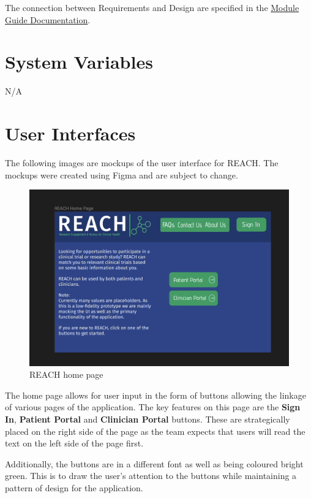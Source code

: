 \documentclass[12pt, titlepage]{article}
\begin{document}
The connection between Requirements and Design are specified in the \href{https://github.com/davimang/REACH/blob/main/docs/Design/SoftArchitecture/MG.pdf}{Module Guide Documentation}.

\section{System Variables}

N/A

\section{User Interfaces}

The following images are mockups of the user interface for REACH. 
The mockups were created using Figma and are subject to change.

\begin{figure}[H]
  \centering
  \includegraphics[width=0.9\linewidth]{images/HomePage.png}
  \caption{REACH home page}
  \label{fig:figure1}
\end{figure}
The home page allows for user input in the form of buttons allowing the linkage of 
various pages of the application. The key features on this page are the \textbf{Sign In},
\textbf{Patient Portal} and \textbf{Clinician Portal} buttons.
These are strategically placed on the right side of the page as the team expects
that users will read the text on the left side of the page first.\newline

Additionally, the buttons are in a different font as well as being
coloured bright green. This is to draw the user's attention to the buttons
while maintaining a pattern of design for the application. \newline
\end{document}
